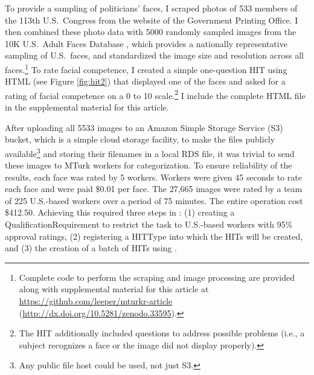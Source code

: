 To provide a sampling of politicians' faces, I scraped photos of 533
members of the 113th U.S.~Congress from the website of the Government
Printing Office. I then combined these photo data with 5000 randomly
sampled images from the 10K U.S.~Adult Faces Database
\citep{BainbridgeIsolaOliva2013}, which provides a nationally
representative sampling of U.S.~faces, and standardized the image size
and resolution across all faces.\footnote{Complete code to perform the
  scraping and image processing are provided along with supplemental
  material for this article at
  \url{https://github.com/leeper/mturkr-article}
  (\url{http://dx.doi.org/10.5281/zenodo.33595}).} To rate facial
competence, I created a simple one-question HIT using HTML (see Figure
\ref{fig:hit2}) that displayed one of the faces and asked for a rating
of facial competence on a 0 to 10 scale.\footnote{The HIT additionally
  included questions to address possible problems (i.e., a subject
  recognizes a face or the image did not display properly).} I include
the complete HTML file in the supplemental material for this article.

After uploading all 5533 images to an Amazon Simple Storage Service
(S3) bucket, which is a simple cloud storage facility, to make the
files publicly available\footnote{Any public file host could be used,
  not just S3.} and storing their filenames in a local RDS file, it
was trivial to send these images to MTurk workers for
categorization. To ensure reliability of the results, each face was
rated by 5 workers. Workers were given 45 seconds to rate each face
and were paid \$0.01 per face. The 27,665 images were rated by a team of
225 U.S.-based workers over a period of 75 minutes. The entire
operation cost \$412.50. Achieving this required three steps in
: (1) creating a QualificationRequirement to restrict the
task to U.S.-based workers with 95\% approval ratings, (2) registering
a HITType into which the HITs will be created, and (3) the creation of
a batch of HITs using .

